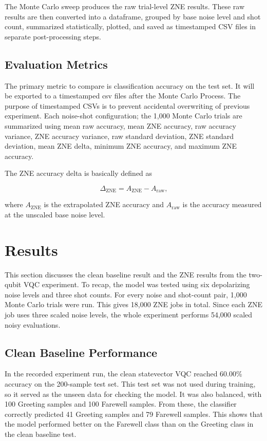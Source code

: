 \documentclass[conference]{IEEEtran}
\begin{document}
The Monte Carlo sweep produces the raw trial-level ZNE results. These raw results
are then converted into a dataframe, grouped by base noise level and shot count,
summarized statistically, plotted, and saved as timestamped CSV files in separate
post-processing steps.

\subsection{Evaluation Metrics}

The primary metric to compare is classification accuracy on the test set. It
will be exported to a timestamped csv files after the Monte Carlo Process.
The purpose of timestamped CSVs is to prevent accidental overwriting of previous
experiment. Each noise-shot configuration; the 1{,}000 Monte Carlo trials are summarized using
mean raw accuracy, mean ZNE accuracy, raw accuracy variance, ZNE accuracy
variance, raw standard deviation, ZNE standard deviation, mean ZNE delta, minimum
ZNE accuracy, and maximum ZNE accuracy.

The ZNE accuracy delta is basically defined as

\[
\Delta_{\mathrm{ZNE}} = A_{\mathrm{ZNE}} - A_{\mathrm{raw}},
\]

where $A_{\mathrm{ZNE}}$ is the extrapolated ZNE accuracy and
$A_{\mathrm{raw}}$ is the accuracy measured at the unscaled base noise level.

\section{Results}

This section discusses the clean baseline result and the ZNE results from the
two-qubit VQC experiment. To recap, the model was tested using six depolarizing noise
levels and three shot counts. For every noise and shot-count pair, 1{,}000 Monte
Carlo trials were run. This gives 18{,}000 ZNE jobs in total. Since each ZNE job
uses three scaled noise levels, the whole experiment performs 54{,}000 scaled
noisy evaluations.

\subsection{Clean Baseline Performance}

In the recorded experiment run, the clean statevector VQC reached 60.00\%
accuracy on the 200-sample test set. This test set was not used during training,
so it served as the unseen data for checking the model. It was also balanced,
with 100 Greeting samples and 100 Farewell samples. From these, the classifier
correctly predicted 41 Greeting samples and 79 Farewell samples. This shows that
the model performed better on the Farewell class than on the Greeting class in
the clean baseline test.
\end{document}
